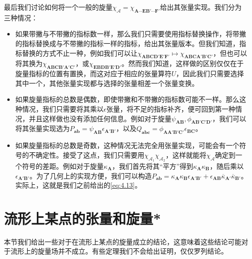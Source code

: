 最后我们讨论如何将一个一般的旋量$\chi _{\mathcal{A}} =\chi _{\boldsymbol{A} \cdots \boldsymbol{EB} '\cdots \boldsymbol{F} '}$给出其张量实现。我们分为三种情况：
\begin{itemize}
	\item 如果带撇与不带撇的指标数一样，那么我们只需要使用指标替换操作，将带撇的指标替换成与不带撇的指标一样的指标，给出其张量版本。但我们知道，指标替换的方式不止一种，例如我们可以让$\chi _{\boldsymbol{ABCD} '\boldsymbol{E} '\boldsymbol{F} '} \mapsto \chi _{\boldsymbol{ABCA} '\boldsymbol{B} '\boldsymbol{C} '}$，但也可以将其换为$\chi _{\boldsymbol{ABCB} '\boldsymbol{A} '\boldsymbol{C} '}$，或$\chi _{\boldsymbol{EBDB} '\boldsymbol{E} '\boldsymbol{D} '}$。然而我们知道，这样做的区别仅仅在于旋量指标的位置有置换，而这对应于相应的张量算符$U$，因此我们只需要选择其中一个，其他张量实现都与选择的张量相差一个张量变换。
	\item 如果旋量指标的总数是偶数，即使带撇和不带撇的指标数可能不一样。那么这种情况，我们只需要将其乘以$\epsilon $张量，将不足的指标补齐，便可回到第一种情况，并且这样做也没有添加任何信息。例如对于旋量$\psi _{\boldsymbol{AB}} ,\phi _{\boldsymbol{AB} '\boldsymbol{C} '\boldsymbol{D} '}$，我们可以将其张量实现选为$P_{\boldsymbol{ab}} =\psi _{\boldsymbol{AB}} \epsilon _{\boldsymbol{A} '\boldsymbol{B} '}$，以及$Q_{\boldsymbol{abc}} =\phi _{\boldsymbol{AA} '\boldsymbol{B} '\boldsymbol{C} '} \epsilon _{\boldsymbol{BC}}$。
	\item 如果旋量指标的总数是奇数，这种情况无法完全用张量实现，可能会有一个符号的不确定性。接受了这点，我们只需要用$\chi _{\mathcal{A}_{1}} \chi _{\mathcal{A}_{2}}$，这样就能将$\chi _{\mathcal{A}}$确定到一个符号的差距。例如对于旋量$\kappa _{\boldsymbol{A}}$，我们首先将其“平方”得到$\kappa _{\boldsymbol{A}} \kappa _{\boldsymbol{B}}$，随后乘以$\epsilon _{\boldsymbol{A} '\boldsymbol{B} '}$。为了几何上的实现方便，我们可以构造$P_{\boldsymbol{ab}} =\kappa _{\boldsymbol{A}} \kappa _{\boldsymbol{B}} \epsilon _{\boldsymbol{A} '\boldsymbol{B} '} +\epsilon _{\boldsymbol{AB}}\overline{\kappa }_{\boldsymbol{A} '}\overline{\kappa }_{\boldsymbol{B} '}$。实际上，这就是我们之前给出的\ref{eq:4.13}。
\end{itemize}


\section{流形上某点的张量和旋量*}

本节我们给出一些对于在流形上某点的旋量成立的结论，这意味着这些结论可能对于流形上的旋量场并不成立。有些定理我们不会给出证明，仅仅罗列结论。

